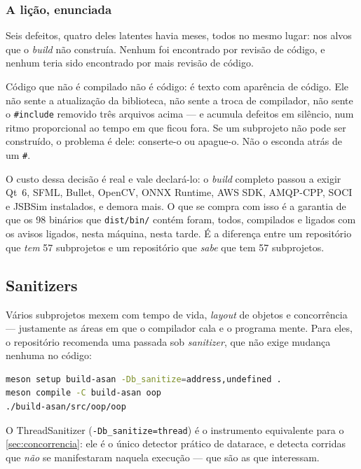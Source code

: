 \subsubsection{A lição, enunciada}

Seis defeitos, quatro deles latentes havia meses, todos no mesmo lugar: nos
alvos que o \emph{build} não construía. Nenhum foi encontrado por revisão de
código, e nenhum teria sido encontrado por mais revisão de código.

\begin{regra}
Código que não é compilado não é código: é texto com aparência de código. Ele
não sente a atualização da biblioteca, não sente a troca de compilador, não
sente o \texttt{\#include} removido três arquivos acima --- e acumula defeitos
em silêncio, num ritmo proporcional ao tempo em que ficou fora. Se um
subprojeto não pode ser construído, o problema é dele: conserte-o ou apague-o.
Não o esconda atrás de um \texttt{\#}.
\end{regra}

O custo dessa decisão é real e vale declará-lo: o \emph{build} completo passou
a exigir Qt~6, SFML, Bullet, OpenCV, ONNX Runtime, AWS SDK, AMQP-CPP, SOCI e
JSBSim instalados, e demora mais. O que se compra com isso é a garantia de que
os 98 binários que \texttt{dist/bin/} contém foram, todos, compilados e
ligados com os avisos ligados, nesta máquina, nesta tarde. É a diferença entre
um repositório que \emph{tem} 57 subprojetos e um repositório que \emph{sabe}
que tem 57 subprojetos.

\subsection{Sanitizers}
\label{sec:sanitizers}

Vários subprojetos mexem com tempo de vida, \emph{layout} de objetos e
concorrência --- justamente as áreas em que o compilador cala e o programa
mente. Para eles, o repositório recomenda uma passada sob \emph{sanitizer}, que
não exige mudança nenhuma no código:

\begin{lstlisting}[style=bt, language=bash,
    caption={Compilando um subprojeto com ASan e UBSan.}]
meson setup build-asan -Db_sanitize=address,undefined .
meson compile -C build-asan oop
./build-asan/src/oop/oop
\end{lstlisting}

O ThreadSanitizer (\texttt{-Db\_sanitize=thread}) é o instrumento equivalente
para o \cref{sec:concorrencia}: ele é o único detector prático de
\gls{datarace}, e detecta corridas que \emph{não} se manifestaram naquela
execução --- que são as que interessam.
